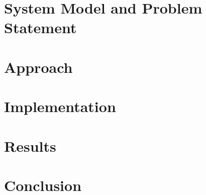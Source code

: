 \documentclass[11pt, journal]{IEEEtran}
\begin{document}
\section{System Model and Problem Statement}


\section{Approach}


\section{Implementation}


\section{Results}


\section{Conclusion}




\end{document}
